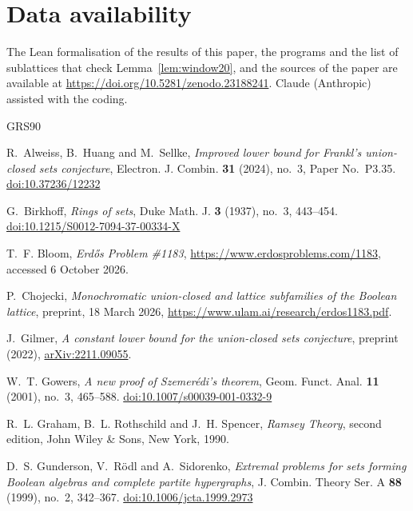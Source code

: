 \documentclass[11pt,reqno]{amsart}
\numberwithin{equation}{section}
\theoremstyle{plain}
\theoremstyle{definition}
\theoremstyle{remark}
\newcommand{\zenododoi}{10.5281/zenodo.23188241}
\begin{document}
\section*{Data availability}

The Lean formalisation of the results of this paper, the programs and
the list of sublattices that check Lemma~\ref{lem:window20}, and the
sources of the paper are available at
\href{https://doi.org/\zenododoi}{https://doi.org/\zenododoi}. Claude
(Anthropic) assisted with the coding.

\begin{thebibliography}{GRS90}
\raggedright

R.~Alweiss, B.~Huang and M.~Sellke,
\emph{Improved lower bound for Frankl's union-closed sets conjecture},
Electron. J. Combin. \textbf{31} (2024), no.~3, Paper No.~P3.35.
\href{https://doi.org/10.37236/12232}{doi:10.37236/12232}

G.~Birkhoff,
\emph{Rings of sets},
Duke Math. J. \textbf{3} (1937), no.~3, 443--454.
\href{https://doi.org/10.1215/S0012-7094-37-00334-X}{doi:10.1215/S0012-7094-37-00334-X}

T.~F. Bloom,
\emph{Erd\H{o}s Problem \#1183},
\url{https://www.erdosproblems.com/1183}, accessed 6 October 2026.

P.~Chojecki,
\emph{Monochromatic union-closed and lattice subfamilies of the Boolean
lattice}, preprint, 18 March 2026,
\url{https://www.ulam.ai/research/erdos1183.pdf}.

J.~Gilmer,
\emph{A constant lower bound for the union-closed sets conjecture},
preprint (2022),
\href{https://arxiv.org/abs/2211.09055}{arXiv:2211.09055}.

W.~T. Gowers,
\emph{A new proof of Szemer\'edi's theorem},
Geom. Funct. Anal. \textbf{11} (2001), no.~3, 465--588.
\href{https://doi.org/10.1007/s00039-001-0332-9}{doi:10.1007/s00039-001-0332-9}

R.~L. Graham, B.~L. Rothschild and J.~H. Spencer,
\emph{Ramsey Theory}, second edition,
John Wiley \& Sons, New York, 1990.

D.~S. Gunderson, V.~R\"odl and A.~Sidorenko,
\emph{Extremal problems for sets forming Boolean algebras and complete
partite hypergraphs},
J. Combin. Theory Ser. A \textbf{88} (1999), no.~2, 342--367.
\href{https://doi.org/10.1006/jcta.1999.2973}{doi:10.1006/jcta.1999.2973}


\end{thebibliography}
\end{document}

